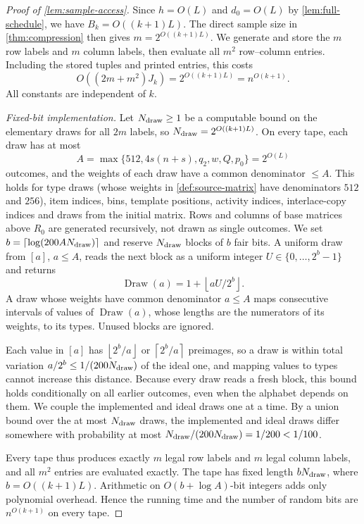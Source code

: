 \documentclass[11pt,letterpaper]{article} \usepackage[utf8]{inputenc}
\theoremstyle{plain} \newtheorem{theorem}{Theorem}[section]
\theoremstyle{definition} \newaliascnt{definition}{theorem}
\newcommand{\ceil}[1]{\left\lceil#1\right\rceil}
\newcommand{\floor}[1]{\left\lfloor#1\right\rfloor}
\begin{document}
\begin{proof}[Proof of \cref{lem:sample-access}]
Since $h=O(L)$ and $d_0=O(L)$ by \cref{lem:full-schedule}, we have $B_k=O((k+1)L)$. The direct sample
size in \cref{thm:compression} then gives $m=2^{O((k+1)L)}$.
We generate and store the $m$ row labels and $m$ column labels, then evaluate all
$m^2$ row--column entries.
Including the stored tuples and printed entries, this costs
\[
O((2m+m^2)J_k)=2^{O((k+1)L)}=n^{O(k+1)}.
\]
All constants are independent of $k$.

\emph{Fixed-bit implementation.}
Let $N_{\rm draw}\ge1$ be a computable bound on the elementary draws for
all $2m$ labels, so $N_{\rm draw}=2^{O((k+1)L)}$. On every tape, each draw
has at most
\[
A=\max\{512,4s(n+s),q_2,w,Q,p_0\}=2^{O(L)}
\]
outcomes, and the weights of each draw have a common denominator $\le A$.
This holds for type draws (whose weights in \cref{def:source-matrix} have
denominators $512$ and $256$), item indices, bins, template positions, activity indices,
interlace-copy indices and draws from the initial matrix. Rows and columns of
base matrices above $R_0$ are generated recursively, not drawn as single outcomes. We set $b=\ceil{\log(200A N_{\rm draw})}$ and reserve
$N_{\rm draw}$ blocks of $b$ fair bits. A uniform draw from $[a]$, $a\le A$, reads the next
block as a uniform integer $U\in\{0,\ldots,2^b-1\}$ and returns
\begin{equation}\label{eq:rounded-draw}
\operatorname{Draw}(a)=1+\floor{aU/2^b}.
\end{equation}
A draw whose weights have common denominator $a\le A$ maps consecutive
intervals of values of $\operatorname{Draw}(a)$, whose lengths are the
numerators of its weights, to its types. Unused blocks are ignored.

Each value in $[a]$ has $\floor{2^b/a}$ or $\ceil{2^b/a}$ preimages, so a
draw is within total variation $a/2^b\le1/(200N_{\rm draw})$ of the ideal
one, and mapping values to types cannot increase this distance. Because every
draw reads a fresh block, this bound holds conditionally on all earlier
outcomes, even when the alphabet depends on them.
We couple the implemented and ideal draws one at a time. By a union bound
over the at most $N_{\rm draw}$ draws, the implemented and ideal draws differ somewhere with probability at most
$N_{\rm draw}/(200N_{\rm draw})=1/200<1/100$.

Every tape thus produces exactly $m$ legal row labels and $m$ legal column
labels, and all $m^2$ entries are evaluated exactly. The tape has fixed length
$bN_{\rm draw}$, where $b=O((k+1)L)$. Arithmetic on $O(b+\log A)$-bit integers adds only
polynomial overhead. Hence the running time and the number of random bits are
$n^{O(k+1)}$ on every tape.
\end{proof}
\end{document}
